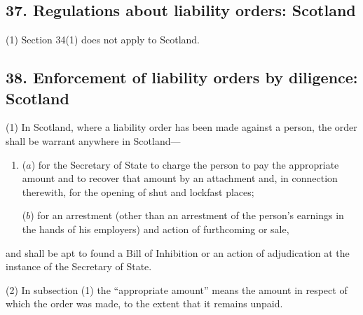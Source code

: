 \documentclass[12pt,a4paper]{article}
\begin{document}

\subsection{37. Regulations about liability orders: Scotland}

(1) Section 34(1)  does not apply to Scotland.

%


\subsection{38. Enforcement of liability orders by diligence: Scotland}

(1) In Scotland, where a liability order has been made against a person, the order shall be warrant anywhere in Scotland—
\begin{enumerate}\item[]
($a$) for the Secretary of State to charge the person to pay the appropriate amount and to recover that amount by 
an attachment  %
and, in connection therewith, for the opening of shut and lockfast places;

($b$) for an arrestment (other than an arrestment of the person’s earnings in the hands of his employers) and action of furthcoming or sale,
\end{enumerate}
and shall be apt to found a Bill of Inhibition or an action of adjudication at the instance of the Secretary of State.

(2) In subsection (1)  the “appropriate amount” means the amount in respect of which the order was made, to the extent that it remains unpaid.

\end{document}

